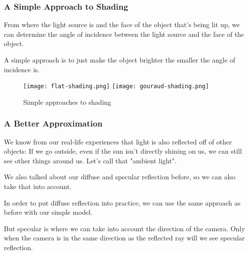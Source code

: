 \documentclass[12pt]{beamer}
\begin{document}
  \begin{frame}
    \frametitle{A Simple Approach to Shading} %

    From where the light source is and the face of the object that's being lit up, we can determine the angle of incidence between the light source and the face of the object.

    A simple approach is to just make the object brighter the smaller the angle of incidence is.




    \begin{figure}
      \centering
      \texttt{[image: flat-shading.png]}
      \texttt{[image: gouraud-shading.png]}
      \caption{Simple approaches to shading}\label{fig:shading}
    \end{figure}

  \end{frame}

  \begin{frame}
    \frametitle{A Better Approximation} %

    We know from our real-life experiences that light is also reflected off of other objects: If we go outside, even if the sun isn't directly shining on us, we can still see other things around us.
    Let's call that "ambient light".

    We also talked about our diffuse and specular reflection before, so we can also take that into account.

    In order to put diffuse reflection into practice, we can use the same approach as before with our simple model.

    But specular is where we can take into account the direction of the camera.
    Only when the camera is in the same direction as the reflected ray will we see specular reflection.

  \end{frame}
\end{document}

